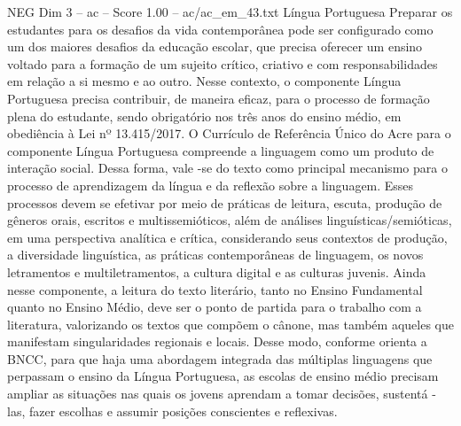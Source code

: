 \begin{textsample}{NEG Dim 3 – ac – Score 1.00 – ac/ac\_em\_43.txt}  \label{ex:f3_neg_267}
Língua Portuguesa Preparar os estudantes para os desafios da vida contemporânea pode ser configurado como um dos maiores desafios da educação escolar, que precisa oferecer um ensino voltado para a formação de um sujeito crítico, criativo e com responsabilidades em relação a si mesmo e ao outro.
Nesse contexto, o componente Língua Portuguesa precisa contribuir, de maneira eficaz, para o processo de formação plena do estudante, sendo obrigatório nos três anos do ensino médio, em obediência à Lei nº 13.415/2017.
O Currículo de Referência Único do Acre para o componente Língua Portuguesa compreende a linguagem como um produto de interação social.
Dessa forma, vale -se do texto como principal mecanismo para o processo de aprendizagem da língua e da reflexão sobre a linguagem.
Esses processos devem se efetivar por meio de práticas de leitura, escuta, produção de gêneros orais, escritos e multissemióticos, além de análises linguísticas/semióticas, em uma perspectiva analítica e crítica, considerando seus contextos de produção, a diversidade linguística, as práticas contemporâneas de linguagem, os novos letramentos e multiletramentos, a cultura digital e as culturas juvenis.
Ainda nesse componente, a leitura do texto literário, tanto no Ensino Fundamental quanto no Ensino Médio, deve ser o ponto de partida para o trabalho com a literatura, valorizando os textos que compõem o cânone, mas também aqueles que manifestam singularidades regionais e locais.
Desse modo, conforme orienta a BNCC, para que haja uma abordagem integrada das múltiplas linguagens que perpassam o ensino da Língua Portuguesa, as escolas de ensino médio precisam ampliar as situações nas quais os jovens aprendam a tomar decisões, sustentá -las, fazer escolhas e assumir posições conscientes e reflexivas.

\end{textsample}
